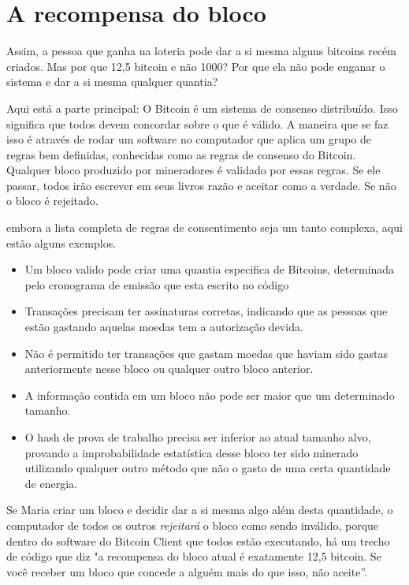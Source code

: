 \section*{A recompensa do bloco}

Assim, a pessoa que ganha na loteria pode dar a si mesma alguns bitcoins recém criados. Mas por que 12,5 bitcoin e não 1000? Por que ela não pode enganar o sistema e dar a si mesma qualquer quantia? 

Aqui está a parte principal: O Bitcoin é um sistema de consenso distribuído. Isso significa que todos devem concordar sobre o que é válido. A maneira que se faz isso é através de rodar um software no computador que aplica um grupo de regras bem definidas, conhecidas como as regras de consenso do Bitcoin. Qualquer bloco produzido por mineradores é validado por essas regras. Se ele passar, todos irão escrever em seus livros razão e aceitar como a verdade. Se não o bloco é rejeitado.

embora a lista completa de regras de consentimento seja um tanto complexa, aqui estão alguns exemplos.
\begin{itemize}
    \item  Um bloco valido pode criar uma quantia especifica de Bitcoins, determinada pelo cronograma de emissão que esta escrito no código
    \item  Transações precisam ter assinaturas corretas, indicando que as pessoas que estão gastando aquelas moedas tem a autorização devida.
    \item Não é permitido ter transações que gastam moedas que haviam sido gastas anteriormente nesse bloco ou qualquer outro bloco anterior.
    \item A informação contida em um bloco não pode ser maior que um determinado tamanho.
    \item O hash de prova de trabalho precisa ser inferior ao atual tamanho alvo, provando a improbabilidade estatística desse bloco ter sido minerado utilizando qualquer outro método que não o gasto de uma certa quantidade de energia.
\end{itemize}
%

Se Maria criar um bloco e decidir dar a si mesma algo além desta quantidade, o computador de todos os outros \textit{rejeitará} o bloco como sendo inválido, porque dentro do software do Bitcoin Client que todos estão executando, há um trecho de código que diz "a recompensa do bloco atual é exatamente 12,5 bitcoin. Se você receber um bloco que concede a alguém mais do que isso, não aceite”.

